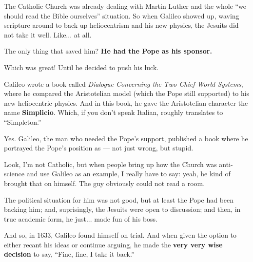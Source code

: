 \vspace{1em}


The Catholic Church was already dealing with Martin Luther and the whole ``we should read the Bible ourselves'' situation. So when Galileo showed up, waving scripture around to back up heliocentrism and his new physics, the Jesuits did not take it well. Like... at all.

The only thing that saved him? \textbf{He had the Pope as his sponsor.} 

Which was great! Until he decided to push his luck. 

Galileo wrote a book called \textit{Dialogue Concerning the Two Chief World Systems}, where he compared the Aristotelian model (which the Pope still supported) to his new heliocentric physics. And in this book, he gave the Aristotelian character the name \textbf{Simplicio}. Which, if you don’t speak Italian, roughly translates to “Simpleton.”

Yes. Galileo, the man who needed the Pope’s support, published a book where he portrayed the Pope’s position as --- not just wrong, but stupid. 

Look, I’m not Catholic, but when people bring up how the Church was anti-science and use Galileo as an example, I really have to say: yeah, he kind of brought that on himself. The guy obviously could not read a room. 

The political situation for him was not good, but at least the Pope had been backing him; and, suprisingly, the Jesuits were open to discussion; and then, in true academic form, he just... made fun of his boss. 

And so, in 1633, Galileo found himself on trial. And when given the option to either recant his ideas or continue arguing, he made the \textbf{very very wise decision} to say, ``Fine, fine, I take it back.''


